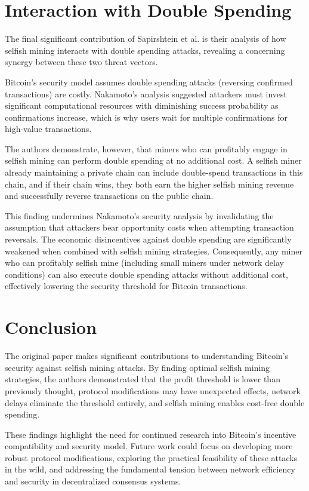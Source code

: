 \documentclass[conference]{IEEEtran}
\begin{document}
\section{Interaction with Double Spending}

The final significant contribution of Sapirshtein et al. is their analysis of how selfish mining interacts with double spending attacks, revealing a concerning synergy between these two threat vectors.

Bitcoin's security model assumes double spending attacks (reversing confirmed transactions) are costly. Nakamoto's analysis suggested attackers must invest significant computational resources with diminishing success probability as confirmations increase, which is why users wait for multiple confirmations for high-value transactions.

The authors demonstrate, however, that miners who can profitably engage in selfish mining can perform double spending at no additional cost. A selfish miner already maintaining a private chain can include double-spend transactions in this chain, and if their chain wins, they both earn the higher selfish mining revenue and successfully reverse transactions on the public chain.

This finding undermines Nakamoto's security analysis by invalidating the assumption that attackers bear opportunity costs when attempting transaction reversals. The economic disincentives against double spending are significantly weakened when combined with selfish mining strategies. Consequently, any miner who can profitably selfish mine (including small miners under network delay conditions) can also execute double spending attacks without additional cost, effectively lowering the security threshold for Bitcoin transactions.

\section{Conclusion}

The original paper makes significant contributions to understanding Bitcoin's security against selfish mining attacks. By finding optimal selfish mining strategies, the authors demonstrated that the profit threshold is lower than previously thought, protocol modifications may have unexpected effects, network delays eliminate the threshold entirely, and selfish mining enables cost-free double spending.

These findings highlight the need for continued research into Bitcoin's incentive compatibility and security model. Future work could focus on developing more robust protocol modifications, exploring the practical feasibility of these attacks in the wild, and addressing the fundamental tension between network efficiency and security in decentralized consensus systems.



\end{document}
